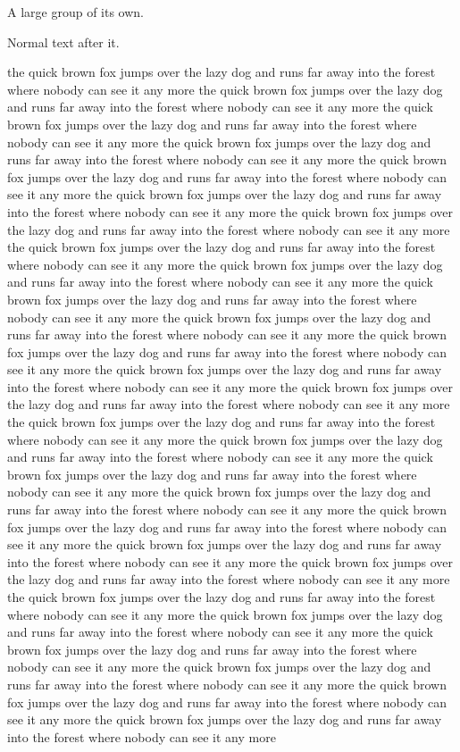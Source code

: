 \documentclass{article}
\begin{document}
{\Large A large group of its own.\par}

Normal text after it.
\begin{figure}[!t]
\vspace{505pt}
\end{figure}
the quick brown fox jumps over the lazy dog and runs far away into the forest where nobody can see it any more the quick brown fox jumps over the lazy dog and runs far away into the forest where nobody can see it any more the quick brown fox jumps over the lazy dog and runs far away into the forest where nobody can see it any more the quick brown fox jumps over the lazy dog and runs far away into the forest where nobody can see it any more the quick brown fox jumps over the lazy dog and runs far away into the forest where nobody can see it any more the quick brown fox jumps over the lazy dog and runs far away into the forest where nobody can see it any more the quick brown fox jumps over the lazy dog and runs far away into the forest where nobody can see it any more the quick brown fox jumps over the lazy dog and runs far away into the forest where nobody can see it any more the quick brown fox jumps over the lazy dog and runs far away into the forest where nobody can see it any more the quick brown fox jumps over the lazy dog and runs far away into the forest where nobody can see it any more the quick brown fox jumps over the lazy dog and runs far away into the forest where nobody can see it any more the quick brown fox jumps over the lazy dog and runs far away into the forest where nobody can see it any more the quick brown fox jumps over the lazy dog and runs far away into the forest where nobody can see it any more the quick brown fox jumps over the lazy dog and runs far away into the forest where nobody can see it any more the quick brown fox jumps over the lazy dog and runs far away into the forest where nobody can see it any more the quick brown fox jumps over the lazy dog and runs far away into the forest where nobody can see it any more the quick brown fox jumps over the lazy dog and runs far away into the forest where nobody can see it any more the quick brown fox jumps over the lazy dog and runs far away into the forest where nobody can see it any more the quick brown fox jumps over the lazy dog and runs far away into the forest where nobody can see it any more the quick brown fox jumps over the lazy dog and runs far away into the forest where nobody can see it any more the quick brown fox jumps over the lazy dog and runs far away into the forest where nobody can see it any more the quick brown fox jumps over the lazy dog and runs far away into the forest where nobody can see it any more the quick brown fox jumps over the lazy dog and runs far away into the forest where nobody can see it any more the quick brown fox jumps over the lazy dog and runs far away into the forest where nobody can see it any more the quick brown fox jumps over the lazy dog and runs far away into the forest where nobody can see it any more the quick brown fox jumps over the lazy dog and runs far away into the forest where nobody can see it any more the quick brown fox jumps over the lazy dog and runs far away into the forest where nobody can see it any more 
\end{document}
